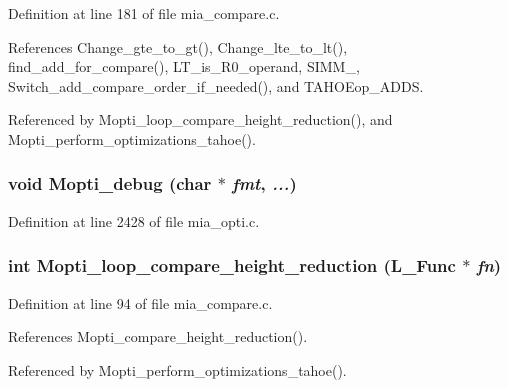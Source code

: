 Definition at line 181 of file mia\_\-compare.c.

References Change\_\-gte\_\-to\_\-gt(), Change\_\-lte\_\-to\_\-lt(), find\_\-add\_\-for\_\-compare(), LT\_\-is\_\-R0\_\-operand, SIMM\_, Switch\_\-add\_\-compare\_\-order\_\-if\_\-needed(), and TAHOEop\_\-ADDS.

Referenced by Mopti\_\-loop\_\-compare\_\-height\_\-reduction(), and Mopti\_\-perform\_\-optimizations\_\-tahoe().
\subsubsection{\setlength{\rightskip}{0pt plus 5cm}void Mopti\_\-debug (char $\ast$ {\em fmt},  {\em ...})}\label{mia__internal_8h_ca52ba4b3401fe69d84481a0a4e0cb94}




Definition at line 2428 of file mia\_\-opti.c.
\subsubsection{\setlength{\rightskip}{0pt plus 5cm}int Mopti\_\-loop\_\-compare\_\-height\_\-reduction (L\_\-Func $\ast$ {\em fn})}\label{mia__internal_8h_3a3e726604ae78872e340ee4c5a252f2}




Definition at line 94 of file mia\_\-compare.c.

References Mopti\_\-compare\_\-height\_\-reduction().

Referenced by Mopti\_\-perform\_\-optimizations\_\-tahoe().